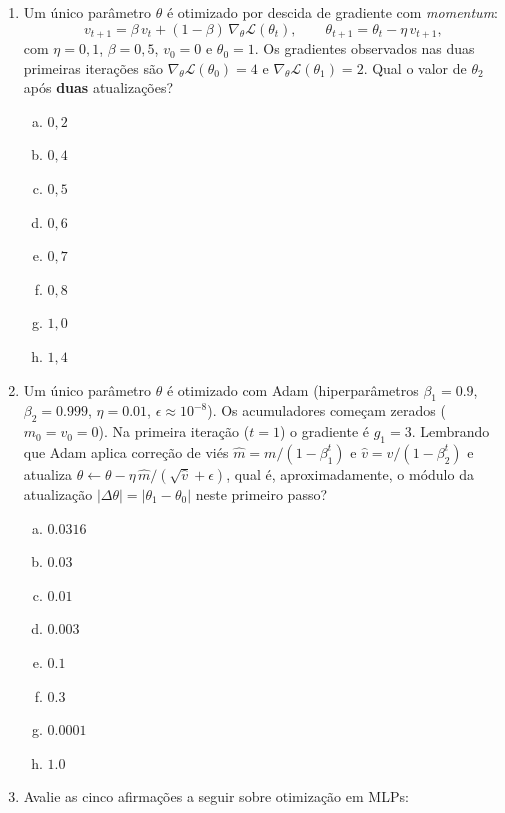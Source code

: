 \documentclass{dlproblemset}
\begin{document}
\begin{enumerate}[1)]
    \item Um único parâmetro $\theta$ é otimizado por descida de gradiente com \textit{momentum}:
    \[
    v_{t+1} = \beta\,v_{t} + (1-\beta)\,\nabla_{\theta}\mathcal{L}(\theta_{t}), \qquad \theta_{t+1} = \theta_{t} - \eta\,v_{t+1},
    \]
    com $\eta = 0{,}1$, $\beta = 0{,}5$, $v_0 = 0$ e $\theta_0 = 1$. Os gradientes observados nas duas primeiras iterações são $\nabla_{\theta}\mathcal{L}(\theta_0) = 4$ e $\nabla_{\theta}\mathcal{L}(\theta_1) = 2$. Qual o valor de $\theta_2$ após \textbf{duas} atualizações?
    \begin{enumerate}[(a)]
        \item $0{,}2$
        \item $0{,}4$
        \item $0{,}5$
        \item $0{,}6$
        \item $0{,}7$
        \item $0{,}8$
        \item $1{,}0$
        \item $1{,}4$
    \end{enumerate}

    \item Um único parâmetro $\theta$ é otimizado com Adam (hiperparâmetros $\beta_1 = 0.9$, $\beta_2 = 0.999$, $\eta = 0.01$, $\epsilon \approx 10^{-8}$). Os acumuladores começam zerados ($m_0 = v_0 = 0$). Na primeira iteração ($t = 1$) o gradiente é $g_1 = 3$. Lembrando que Adam aplica correção de viés $\hat{m} = m / (1 - \beta_1^{t})$ e $\hat{v} = v / (1 - \beta_2^{t})$ e atualiza $\theta \leftarrow \theta - \eta\,\hat{m}/(\sqrt{\hat{v}} + \epsilon)$, qual é, aproximadamente, o módulo da atualização $|\Delta\theta| = |\theta_1 - \theta_0|$ neste primeiro passo?
    \begin{enumerate}[(a)]
        \item $0.0316$
        \item $0.03$
        \item $0.01$
        \item $0.003$
        \item $0.1$
        \item $0.3$
        \item $0.0001$
        \item $1.0$
    \end{enumerate}

    \item Avalie as cinco afirmações a seguir sobre otimização em MLPs:


\end{enumerate}
\end{document}
